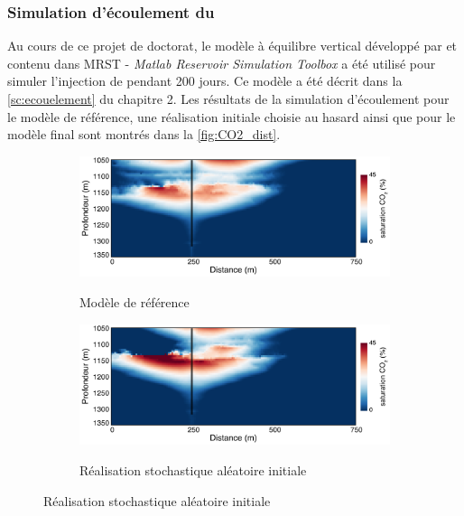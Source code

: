 \subsubsection{Simulation d'écoulement du \texorpdfstring{}{CO2}}
Au cours de ce projet de doctorat, le modèle à équilibre vertical développé par \citep{Ligaarden2010} et contenu
dans MRST - \emph{Matlab Reservoir Simulation Toolbox} \citep{Lie2012} a été
utilisé pour simuler l'injection de  pendant \num{200} jours. Ce modèle
a été décrit dans la \cref{sc:ecouelement} du chapitre 2. Les résultats
de la simulation d'écoulement pour le modèle de référence, une réalisation
 initiale choisie au hasard ainsi que pour le modèle final sont montrés dans la
\cref{fig:CO2_dist}.
\begin{figure}[!ht]
        \centering
        \begin{subfigure}[b]{0.7\textwidth}
                \caption{Modèle de référence}
                \includegraphics[width=\textwidth]{fig/CO2_ref.pdf}
                \label{fig:CO2_ref}
        \end{subfigure}%

        \begin{subfigure}[b]{0.7\textwidth}
                \caption{Réalisation stochastique aléatoire initiale}
                \includegraphics[width=\textwidth]{fig/CO2_real.pdf}
                \label{fig:CO_real}
        \end{subfigure}


\end{figure}
